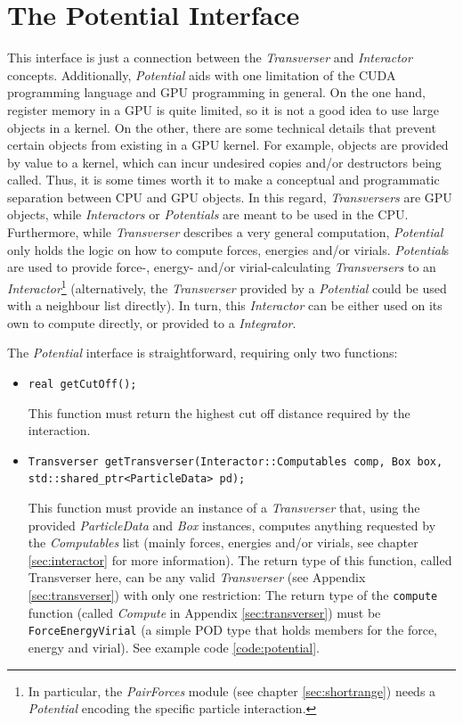 \documentclass[ twoside,openright,titlepage,numbers=noenddot,%
headinclude,footinclude,cleardoublepage=empty,abstract=on,
BCOR=5mm,paper=b5,fontsize=11pt, dvipsnames
]{scrreprt}
\def\ucpp{uammd_cpp_lexer.py:UAMMDCppLexer -x}
\newcommand{\gpu}{\gls{GPU}\xspace}
\begin{document}
\section{The Potential Interface} \label{sec:potential}

This interface is just a connection between the \emph{Transverser} and \emph{Interactor} concepts. Additionally, \emph{Potential} aids with one limitation of the CUDA programming language and \gls{GPU} programming in general. On the one hand, register memory in a \gpu is quite limited, so it is not a good idea to use large objects in a kernel. On the other, there are some technical details that prevent certain objects from existing in a \gpu kernel. For example, objects are provided by value to a kernel, which can incur undesired copies and/or destructors being called. Thus, it is some times worth it to make a conceptual and programmatic separation between CPU and \gpu objects.
In this regard, \emph{Transversers} are \gpu objects, while \emph{Interactors} or \emph{Potentials} are meant to be used in the CPU.
Furthermore, while \emph{Transverser} describes a very general computation, \emph{Potential} only holds the logic on how to compute forces, energies and/or virials.
\emph{Potential}s are used to provide force-, energy- and/or virial-calculating \emph{Transversers} to an \emph{Interactor}\footnote{In particular, the \emph{PairForces} module (see chapter \ref{sec:shortrange}) needs a \emph{Potential} encoding the specific particle interaction.} (alternatively, the \emph{Transverser} provided by a \emph{Potential} could be used with a neighbour list directly). In turn, this \emph{Interactor} can be either used on its own to compute directly, or provided to a \emph{Integrator}. %

The \emph{Potential} interface is straightforward, requiring only two functions:
\begin{itemize}
\item \texttt{real getCutOff();}
  
  This function must return the highest cut off distance required by the interaction.
\item \texttt{Transverser getTransverser(Interactor::Computables comp, Box box, std::shared_ptr<ParticleData> pd);}
  
  This function must provide an instance of a \emph{Transverser} that, using the provided \emph{ParticleData} and \emph{Box} instances, computes anything requested by the \emph{Computables} list (mainly forces, energies and/or virials, see chapter \ref{sec:interactor} for more information).
  The return type of this function, called Transverser here, can be any valid \emph{Transverser} (see Appendix \ref{sec:transverser}) with only one restriction: The return type of the \texttt{compute} function (called \emph{Compute} in Appendix \ref{sec:transverser}) must be \texttt{ForceEnergyVirial} (a simple POD type that holds members for the force, energy and virial). See example code \ref{code:potential}.
\end{itemize}
\end{document}
